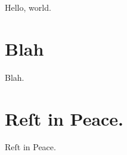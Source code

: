 \documentclass[12pt,a4paper]{article}
\begin{document}
Hello, world.

\tableofcontents

\section{Blah}
Blah.

\section{Reſt in Peace.}
Reſt in Peace.
\end{document}
